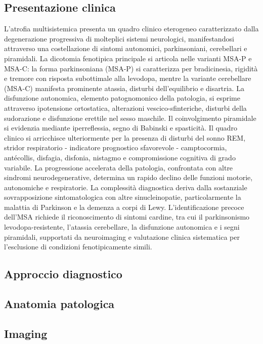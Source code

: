 \subsection{Presentazione  clinica}
L'atrofia multisistemica presenta un quadro clinico eterogeneo caratterizzato dalla degenerazione progressiva di molteplici sistemi neurologici, manifestandosi attraverso una costellazione di sintomi autonomici, parkinsoniani, cerebellari e piramidali. La dicotomia fenotipica principale si articola nelle varianti MSA-P e MSA-C: la forma parkinsoniana (MSA-P) si caratterizza per bradicinesia, rigidità e tremore con risposta subottimale alla levodopa, mentre la variante cerebellare (MSA-C) manifesta prominente atassia, disturbi dell'equilibrio e disartria. La disfunzione autonomica, elemento patognomonico della patologia, si esprime attraverso ipotensione ortostatica, alterazioni vescico-sfinteriche, disturbi della sudorazione e disfunzione erettile nel sesso maschile. Il coinvolgimento piramidale si evidenzia mediante iperreflessia, segno di Babinski e spasticità. Il quadro clinico si arricchisce ulteriormente per la presenza di disturbi del sonno REM, stridor respiratorio - indicatore prognostico sfavorevole - camptocormia, antécollis, disfagia, disfonia, nistagmo e compromissione cognitiva di grado variabile. La progressione accelerata della patologia, confrontata con altre sindromi neurodegenerative, determina un rapido declino delle funzioni motorie, autonomiche e respiratorie. La complessità diagnostica deriva dalla sostanziale sovrapposizione sintomatologica con altre sinucleinopatie, particolarmente la malattia di Parkinson e la demenza a corpi di Lewy. L'identificazione precoce dell'MSA richiede il riconoscimento di sintomi cardine, tra cui il parkinsonismo levodopa-resistente, l'atassia cerebellare, la disfunzione autonomica e i segni piramidali, supportati da neuroimaging e valutazione clinica sistematica per l'esclusione di condizioni fenotipicamente simili.

\subsection{Approccio diagnostico}

\subsection{Anatomia patologica}

\subsection{Imaging}

